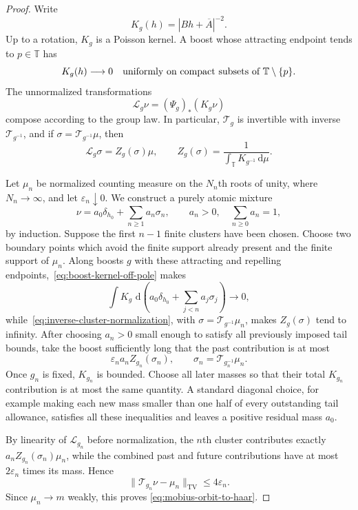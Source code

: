 \documentclass[11pt]{article}
\theoremstyle{remark}
\newcommand{\T}{\mathbb T}
\newcommand{\dd}{\,\mathrm d}
\begin{document}
\begin{proof}
Write
\[
 K_g(h)=|Bh+\overline A|^{-2}.
\]
Up to a rotation, $K_g$ is a Poisson kernel.  A boost whose attracting
endpoint tends to $p\in\T$ has
\begin{equation}
 K_g(h)\longrightarrow0
 \quad\hbox{uniformly on compact subsets of }\T\setminus\{p\}.
 \label{eq:boost-kernel-off-pole}
\end{equation}
The unnormalized transformations
\[
 \mathcal L_g\nu=(\Psi_g)_*(K_g\nu)
\]
compose according to the group law.  In particular,
$\mathcal T_g$ is invertible with inverse $\mathcal T_{g^{-1}}$, and if
$\sigma=\mathcal T_{g^{-1}}\mu$, then
\begin{equation}
 \mathcal L_g\sigma
 =Z_g(\sigma)\mu,
 \qquad
 Z_g(\sigma)=
 \frac1{\displaystyle\int_\T K_{g^{-1}}\dd\mu}.
 \label{eq:inverse-cluster-normalization}
\end{equation}

Let $\mu_n$ be normalized counting measure on the $N_n$th roots of unity,
where $N_n\to\infty$, and let $\varepsilon_n\downarrow0$.  We construct a
purely atomic mixture
\[
 \nu=a_0\delta_{h_0}+\sum_{n\geq1}a_n\sigma_n,
 \qquad
 a_n>0,\quad \sum_{n\geq0}a_n=1,
 \label{eq:atomic-zoom-mixture}
\]
by induction.  Suppose the first $n-1$ finite clusters have been chosen.
Choose two boundary points which avoid the finite support already present
and the finite support of $\mu_n$.  Along boosts $g$ with these attracting
and repelling endpoints,~\eqref{eq:boost-kernel-off-pole} makes
\[
 \int K_g\,\dd
 \left(a_0\delta_{h_0}+\sum_{j<n}a_j\sigma_j\right)
 \longrightarrow0,
 \]
while~\eqref{eq:inverse-cluster-normalization}, with
$\sigma=\mathcal T_{g^{-1}}\mu_n$, makes $Z_g(\sigma)$ tend to infinity.
After choosing $a_n>0$ small enough to satisfy all previously imposed tail
bounds, take the boost sufficiently long that the past contribution is at
most
\[
 \varepsilon_n a_nZ_{g_n}(\sigma_n),
 \qquad
 \sigma_n=\mathcal T_{g_n^{-1}}\mu_n.
 \]
Once $g_n$ is fixed, $K_{g_n}$ is bounded.  Choose all later masses so that
their total $K_{g_n}$ contribution is at most the same quantity.  A standard
diagonal choice, for example making each new mass smaller than one half of
every outstanding tail allowance, satisfies all these inequalities and
leaves a positive residual mass $a_0$.

By linearity of $\mathcal L_{g_n}$ before normalization, the $n$th cluster
contributes exactly
$a_nZ_{g_n}(\sigma_n)\mu_n$, while the combined past and future
contributions have at most $2\varepsilon_n$ times its mass.  Hence
\[
 \|\mathcal T_{g_n}\nu-\mu_n\|_{\mathrm{TV}}
 \leq4\varepsilon_n.
\]
Since $\mu_n\to m$ weakly, this proves
\eqref{eq:mobius-orbit-to-haar}.


\end{proof}
\end{document}
